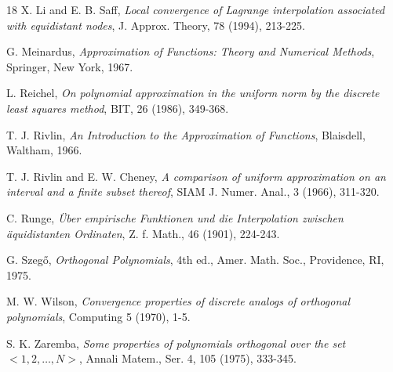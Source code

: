 \begin{thebibliography}{18}
{\sc X. Li and E. B. Saff}, {\em Local convergence of Lagrange interpolation
associated with equidistant nodes}, J. Approx. Theory, 78 (1994), 213-225.

{\sc G. Meinardus}, {\em Approximation of Functions:  Theory and
Numerical Methods}, Springer, New York, 1967.

{\sc L. Reichel}, {\em On polynomial approximation in the uniform norm by
the discrete least squares method}, BIT, 26 (1986), 349-368.

{\sc T. J. Rivlin}, {\em An Introduction to the Approximation of Functions},
Blaisdell, Waltham, 1966.

{\sc T. J. Rivlin and E. W. Cheney}, {\em A comparison of uniform
approximation on an interval and a finite subset thereof}, SIAM J.
Numer. Anal., 3 (1966), 311-320.

{\sc C. Runge}, {\em \"{U}ber empirische Funktionen und die Interpolation
zwischen \"{a}quidistanten Ordinaten}, Z. f. Math., 46 (1901), 224-243.

{\sc G. Szeg\H{o}}, {\em Orthogonal Polynomials}, 4th ed., Amer. Math.
Soc., Providence, RI, 1975.

{\sc M. W. Wilson}, {\em Convergence properties of discrete analogs
of orthogonal polynomials}, Computing 5 (1970), 1-5.

{\sc S. K. Zaremba}, {\em Some properties of polynomials orthogonal over
the set $< 1, 2, \ldots, N>$}, Annali Matem., Ser. 4, 105
(1975), 333-345.
\end{thebibliography}

\newpage

